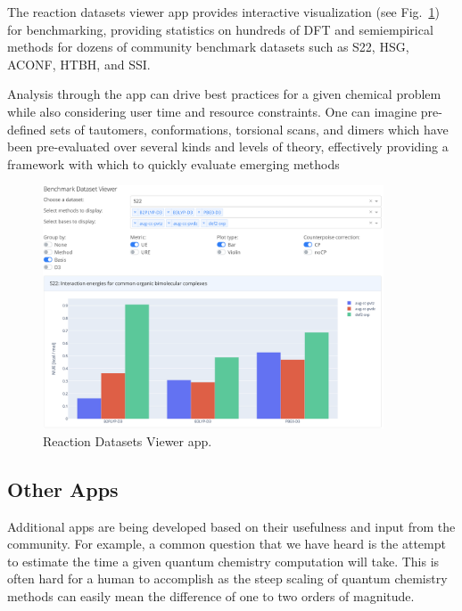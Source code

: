 \documentclass[journal=jctcce,manuscript=article]{achemso}
\begin{document}
The reaction datasets viewer app provides interactive visualization (see Fig.~\ref{fig:dbapp}) for benchmarking, providing statistics on hundreds of DFT and semiempirical methods for dozens of community benchmark datasets such as S22,\cite{Jurecka:2006:1985, Marshall:2011:194102}
HSG,\cite{Faver:2011:790, Marshall:2011:194102}
ACONF,\cite{Gruzman:2009:11974}
HTBH,\cite{Zhao:2005:2012} and
SSI.\cite{Burns:2017:161727}

Analysis through the app can drive best practices for a given chemical problem while also considering user time and resource constraints. One can imagine pre-defined sets of tautomers, conformations, torsional scans, and dimers which have been pre-evaluated over several kinds and levels of theory, effectively providing a framework with which to quickly evaluate emerging methods

\begin{figure}[H]
\includegraphics[width=0.9\textwidth]{./images/apps_reaction_datasets_v3.png}
\centering
\caption{Reaction Datasets Viewer app.
\label{fig:dbapp}}
\end{figure}

\subsection{Other Apps}

Additional apps are being developed based on their usefulness and input from the community.
For example, a common question that we have heard is the attempt to estimate the time a given quantum chemistry computation will take.
This is often hard for a human to accomplish as the steep scaling of quantum chemistry methods can easily mean the difference of one to two orders of magnitude.
\end{document}
